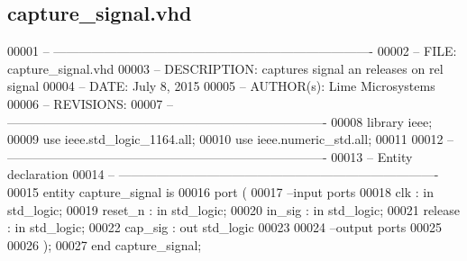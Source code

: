 \subsection{capture\+\_\+signal.\+vhd}
\label{capture__signal_8vhd_source}

\begin{DoxyCode}
00001 \textcolor{keyword}{-- ---------------------------------------------------------------------------- }
00002 \textcolor{keyword}{-- FILE:    capture\_signal.vhd}
00003 \textcolor{keyword}{-- DESCRIPTION: captures signal an releases on rel signal}
00004 \textcolor{keyword}{-- DATE:    July 8, 2015}
00005 \textcolor{keyword}{-- AUTHOR(s):   Lime Microsystems}
00006 \textcolor{keyword}{-- REVISIONS:}
00007 \textcolor{keyword}{-- ---------------------------------------------------------------------------- }
00008 \textcolor{vhdlkeyword}{library }\textcolor{keywordflow}{ieee};
00009 \textcolor{vhdlkeyword}{use }ieee.std\_logic\_1164.\textcolor{keywordflow}{all};
00010 \textcolor{vhdlkeyword}{use }ieee.numeric\_std.\textcolor{keywordflow}{all};
00011 
00012 \textcolor{keyword}{-- ----------------------------------------------------------------------------}
00013 \textcolor{keyword}{-- Entity declaration}
00014 \textcolor{keyword}{-- ----------------------------------------------------------------------------}
00015 \textcolor{keywordflow}{entity }capture_signal \textcolor{keywordflow}{is}
00016   \textcolor{keywordflow}{port} \textcolor{vhdlchar}{(}
00017 \textcolor{keyword}{        --input ports }
00018         \textcolor{vhdlchar}{clk}       \textcolor{vhdlchar}{:} \textcolor{keywordflow}{in} \textcolor{comment}{std\_logic};
00019         \textcolor{vhdlchar}{reset_n}   \textcolor{vhdlchar}{:} \textcolor{keywordflow}{in} \textcolor{comment}{std\_logic};
00020           \textcolor{vhdlchar}{in_sig}        \textcolor{vhdlchar}{:} \textcolor{keywordflow}{in} \textcolor{comment}{std\_logic};
00021           \textcolor{keywordflow}{release}   \textcolor{vhdlchar}{:} \textcolor{keywordflow}{in} \textcolor{comment}{std\_logic};
00022           \textcolor{vhdlchar}{cap\_sig}   \textcolor{vhdlchar}{:} \textcolor{keywordflow}{out} \textcolor{comment}{std\_logic}
00023 
00024 \textcolor{keyword}{        --output ports }
00025         
00026         \textcolor{vhdlchar}{)};
00027 \textcolor{keywordflow}{end} \textcolor{vhdlchar}{capture\_signal};

\end{DoxyCode}
